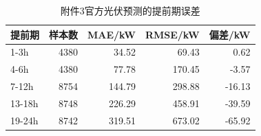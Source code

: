 \begin{table}[H]
\centering
\small
\caption{附件3官方光伏预测的提前期误差}
\label{tab:q3-official-lead}
\begin{tabular}{lrrrr}
\toprule
提前期 & 样本数 & MAE/kW & RMSE/kW & 偏差/kW \\
\midrule
1-3h & 4380 & 34.52 & 69.43 & 0.62 \\
4-6h & 4380 & 77.78 & 170.45 & -3.57 \\
7-12h & 8754 & 144.79 & 298.88 & -16.13 \\
13-18h & 8748 & 226.29 & 458.91 & -39.59 \\
19-24h & 8742 & 319.51 & 673.02 & -65.92 \\
\bottomrule
\end{tabular}
\end{table}
